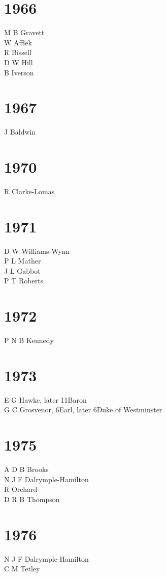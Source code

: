\begin{multicols}{2}
  \section*{1966}
  M B Gravett \\
  W Afflek \\
  R Bissell \\
  D W Hill \\
  B Iverson \\
  \section*{1967}
  J Baldwin \\
  \section*{1970}
  R Clarke-Lomas \\
  \section*{1971}
  D W Williams-Wynn \\
  P L Mather \\
  J L Gabbot \\
  P T Roberts \\
  \section*{1972}
  P N B Kennedy \\
  \section*{1973}
  E G Hawke, later 11\nth Baron \\
  G C Grosvenor, 6\nth Earl, later 6\nth Duke of Westminster \\
  \section*{1975}
  A D B Brooks \\
  N J F Dalrymple-Hamilton \\
  R Orchard \\
  D R B Thompson \\
  \section*{1976}
  N J F Dalrymple-Hamilton \\
  C M Tetley \\

\end{multicols}
